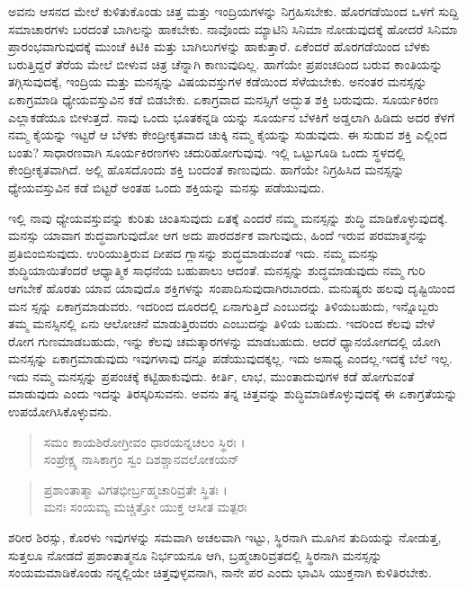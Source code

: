 ಅವನು ಆಸನದ ಮೇಲೆ ಕುಳಿತುಕೊಂಡು ಚಿತ್ತ ಮತ್ತು ಇಂದ್ರಿಯಗಳನ್ನು ನಿಗ್ರಹಿಸಬೇಕು. ಹೊರಗಡೆಯಿಂದ ಒಳಗೆ ಸುದ್ದಿ ಸಮಾಚಾರಗಳು ಬರದಂತೆ ಬಾಗಿಲನ್ನು ಹಾಕಬೇಕು. ನಾವೊಂದು ಮ್ಯಾಟಿನಿ ಸಿನಿಮಾ ನೋಡುವುದಕ್ಕೆ ಹೋದರೆ ಸಿನಿಮಾ ಪ್ರಾರಂಭವಾಗುವುದಕ್ಕೆ ಮುಂಚೆ ಕಿಟಿಕಿ ಮತ್ತು ಬಾಗಿಲುಗಳನ್ನು ಹಾಕುತ್ತಾರೆ. ಏಕೆಂದರೆ ಹೊರಗಡೆಯಿಂದ ಬೆಳಕು ಬರುತ್ತಿದ್ದರೆ ತೆರೆಯ ಮೇಲೆ ಬೀಳುವ ಚಿತ್ರ ಚೆನ್ನಾಗಿ ಕಾಣುವುದಿಲ್ಲ. ಹಾಗೆಯೇ ಪ್ರಪಂಚದಿಂದ ಬರುವ ಕಾಂತಿಯನ್ನು ತಗ್ಗಿಸುವುದಕ್ಕೆ, ಇಂದ್ರಿಯ ಮತ್ತು ಮನಸ್ಸನ್ನು ವಿಷಯವಸ್ತುಗಳ ಕಡೆಯಿಂದ ಸೆಳೆಯಬೇಕು. ಅನಂತರ ಮನಸ್ಸನ್ನು ಏಕಾಗ್ರಮಾಡಿ ಧ್ಯೇಯವಸ್ತುವಿನ ಕಡೆ ಬಿಡಬೇಕು. ಏಕಾಗ್ರವಾದ ಮನಸ್ಸಿಗೆ ಅದ್ಭುತ ಶಕ್ತಿ ಬರುವುದು. ಸೂರ್ಯಕಿರಣ ಎಲ್ಲಾಕಡೆಯೂ ಬೀಳುತ್ತದೆ. ನಾವು ಒಂದು ಭೂತಕನ್ನಡಿ ಯನ್ನು ಸೂರ್ಯನ ಬೆಳಕಿಗೆ ಅಡ್ಡಲಾಗಿ ಹಿಡಿದು ಅದರ ಕೆಳಗೆ ನಮ್ಮ ಕೈಯನ್ನು ಇಟ್ಟರೆ ಆ ಬೆಳಕು ಕೇಂದ್ರೀಕೃತವಾದ ಚುಕ್ಕಿ ನಮ್ಮ ಕೈಯನ್ನು ಸುಡುವುದು. ಈ ಸುಡುವ ಶಕ್ತಿ ಎಲ್ಲಿಂದ ಬಂತು? ಸಾಧಾರಣವಾಗಿ ಸೂರ್ಯಕಿರಣಗಳು ಚದುರಿಹೋಗುವುವು. ಇಲ್ಲಿ ಒಟ್ಟುಗೂಡಿ ಒಂದು ಸ್ಥಳದಲ್ಲಿ ಕೇಂದ್ರೀಕೃತವಾಗಿದೆ. ಅಲ್ಲಿ ಹೊಸದೊಂದು ಶಕ್ತಿ ಬಂದಂತೆ ಕಾಣುವುದು. ಹಾಗೆಯೇ ನಿಗ್ರಹಿಸಿದ ಮನಸ್ಸನ್ನು ಧ್ಯೇಯವಸ್ತುವಿನ ಕಡೆ ಬಿಟ್ಟರೆ ಅಂತಹ ಒಂದು ಶಕ್ತಿಯನ್ನು ಮನಸ್ಸು ಪಡೆಯುವುದು.

ಇಲ್ಲಿ ನಾವು ಧ್ಯೇಯವಸ್ತುವನ್ನು ಕುರಿತು ಚಿಂತಿಸುವುದು ಏತಕ್ಕೆ ಎಂದರೆ ನಮ್ಮ ಮನಸ್ಸನ್ನು ಶುದ್ಧಿ ಮಾಡಿಕೊಳ್ಳುವುದಕ್ಕೆ. ಮನಸ್ಸು ಯಾವಾಗ ಶುದ್ಧವಾಗುವುದೋ ಆಗ ಅದು ಪಾರದರ್ಶಕ ವಾಗುವುದು, ಹಿಂದೆ ಇರುವ ಪರಮಾತ್ಮನನ್ನು ಪ್ರತಿಬಿಂಬಿಸುವುದು. ಉರಿಯುತ್ತಿರುವ ದೀಪದ ಗ್ಲಾಸನ್ನು ಶುದ್ಧಮಾಡುವಂತೆ ಇದು. ನಮ್ಮ ಮನಸ್ಸು ಶುದ್ಧಿಯಾಯಿತೆಂದರೆ ಆಧ್ಯಾತ್ಮಿಕ ಸಾಧನೆಯ ಬಹುಪಾಲು ಆದಂತೆ. ಮನಸ್ಸನ್ನು ಶುದ್ಧಮಾಡುವುದು ನಮ್ಮ ಗುರಿ ಆಗಬೇಕೆ ಹೊರತು ಯಾವ ಯಾವುದೊ ಶಕ್ತಿಗಳನ್ನು ಸಂಪಾದಿಸುವುದಾಗಿರಬಾರದು. ಮನುಷ್ಯರು ಹಲವು ದೃಷ್ಟಿಯಿಂದ ಮನ ಸ್ಸನ್ನು ಏಕಾಗ್ರಮಾಡುವರು. ಇದರಿಂದ ದೂರದಲ್ಲಿ ಏನಾಗುತ್ತಿದೆ ಎಂಬುದನ್ನು ತಿಳಿಯಬಹುದು, ಇನ್ನೊಬ್ಬರು ತಮ್ಮ ಮನಸ್ಸಿನಲ್ಲಿ ಏನು ಆಲೋಚನೆ ಮಾಡುತ್ತಿರುವರು ಎಂಬುದನ್ನು ತಿಳಿಯ ಬಹುದು. ಇದರಿಂದ ಕೆಲವು ವೇಳೆ ರೋಗ ಗುಣಮಾಡಬಹುದು, ಇನ್ನು ಕೆಲವು ಚಮತ್ಕಾರಗಳನ್ನು ಮಾಡಬಹುದು. ಆದರೆ ಧ್ಯಾನಯೋಗದಲ್ಲಿ ಯೋಗಿ ಮನಸ್ಸನ್ನು ಏಕಾಗ್ರಮಾಡುವುದು ಇವುಗಳಾವು ದನ್ನೂ ಪಡೆಯುವುದಕ್ಕಲ್ಲ. ಇದು ಅಸಾಧ್ಯ ಎಂದಲ್ಲ.ಇದಕ್ಕೆ ಬೆಲೆ ಇಲ್ಲ. ಇದು ನಮ್ಮ ಮನಸ್ಸನ್ನು ಪ್ರಪಂಚಕ್ಕೆ ಕಟ್ಟಿಹಾಕುವುದು. ಕೀರ್ತಿ, ಲಾಭ, ಮುಂತಾದುವುಗಳ ಕಡೆ ಹೋಗುವಂತೆ ಮಾಡುವುದು ಎಂದು ಇದನ್ನು ತಿರಸ್ಕರಿಸುವನು. ಅವನು ತನ್ನ ಚಿತ್ತವನ್ನು ಶುದ್ಧಿಮಾಡಿಕೊಳ್ಳುವುದಕ್ಕೆ ಈ ಏಕಾಗ್ರತೆಯನ್ನು ಉಪಯೋಗಿಸಿಕೊಳ್ಳುವನು.

\begin{verse}
ಸಮಂ ಕಾಯಶಿರೋಗ್ರೀವಂ ಧಾರಯನ್ನಚಲಂ ಸ್ಥಿರಃ ।\\ಸಂಪ್ರೇಕ್ಷ್ಯ ನಾಸಿಕಾಗ್ರಂ ಸ್ವಂ ದಿಶಶ್ಚಾನವಲೋಕಯನ್ 
\end{verse}

\begin{verse}
ಪ್ರಶಾಂತಾತ್ಮಾ ವಿಗತಭೀರ್ಬ್ರಹ್ಮಚಾರಿವ್ರತೇ ಸ್ಥಿತಃ ।\\ಮನಃ ಸಂಯಮ್ಯ ಮಚ್ಚಿತ್ತೋ ಯುಕ್ತ ಆಸೀತ ಮತ್ಪರಃ 
\end{verse}

{\small ಶರೀರ ಶಿರಸ್ಸು, ಕೊರಳು ಇವುಗಳನ್ನು ಸಮವಾಗಿ ಅಚಲವಾಗಿ ಇಟ್ಟು, ಸ್ಥಿರನಾಗಿ ಮೂಗಿನ ತುದಿಯನ್ನು ನೋಡುತ್ತ, ಸುತ್ತಲೂ ನೋಡದೆ ಪ್ರಶಾಂತಾತ್ಮನೂ ನಿರ್ಭಯನೂ ಆಗಿ, ಬ್ರಹ್ಮಚಾರಿವ್ರತದಲ್ಲಿ ಸ್ಥಿರನಾಗಿ ಮನಸ್ಸನ್ನು ಸಂಯಮಮಾಡಿಕೊಂಡು ನನ್ನಲ್ಲಿಯೇ ಚಿತ್ತವುಳ್ಳವನಾಗಿ, ನಾನೇ ಪರ ಎಂದು ಭಾವಿಸಿ ಯುಕ್ತನಾಗಿ ಕುಳಿತಿರಬೇಕು.}

